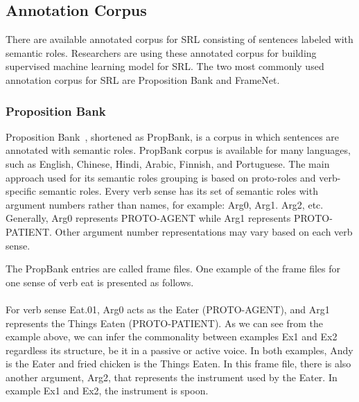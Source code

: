 \subsection{Annotation Corpus}
There are available annotated corpus for SRL consisting of sentences labeled with semantic roles. Researchers are using these annotated corpus for building supervised machine learning model for SRL. The two most commonly used annotation corpus for SRL are Proposition Bank and FrameNet.

\subsubsection{Proposition Bank}
Proposition Bank~\citep{kingsbury2002treebank}, shortened as PropBank, is a corpus in which sentences are annotated with semantic roles. PropBank corpus is available for many languages, such as English, Chinese, Hindi, Arabic, Finnish, and Portuguese. The main approach used for its semantic roles grouping is based on proto-roles and verb-specific semantic roles. Every verb sense has its set of semantic roles with argument numbers rather than names, for example: Arg0, Arg1. Arg2, etc. Generally, Arg0 represents PROTO-AGENT while Arg1 represents PROTO-PATIENT. Other argument number representations may vary based on each verb sense.

The PropBank entries are called frame files. One example of the frame files for one sense of verb eat is presented as follows.
\\
\\

For verb sense Eat.01, Arg0 acts as the Eater (PROTO-AGENT), and Arg1 represents the Things Eaten (PROTO-PATIENT). As we can see from the example above, we can infer the commonality between examples Ex1 and Ex2 regardless its structure, be it in a passive or active voice. In both examples, Andy is the Eater and fried chicken is the Things Eaten. In this frame file, there is also another argument, Arg2, that represents the instrument used by the Eater. In example Ex1 and Ex2, the instrument is spoon.


